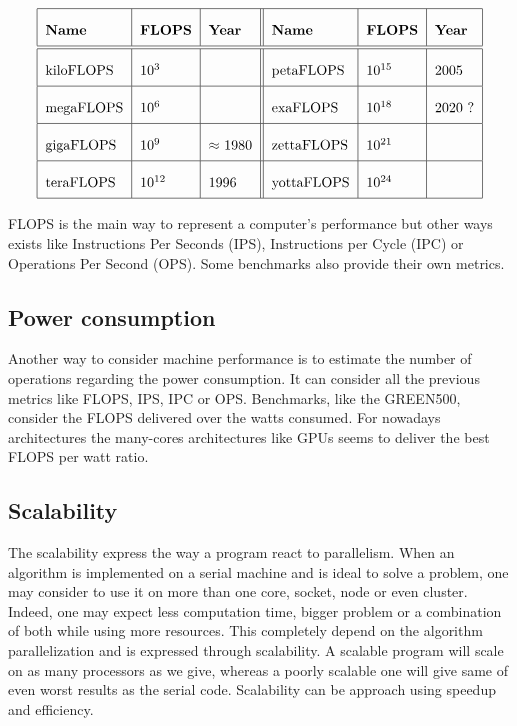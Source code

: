 \begin{table}
\[\arraycolsep=1.4pt\def\arraystretch{2.2}
\begin{tabular}{| l | l | l || l | l | l |}
\hline
	\textbf{Name} & \textbf{FLOPS} & \textbf{Year} & \textbf{Name} & \textbf{FLOPS} & \textbf{Year} \\
	\hline
	\hline
	kiloFLOPS & $10^{3}$ & & petaFLOPS  & $10^{15}$ & 2005 \\ 
	\hline
	megaFLOPS & $10^{6}$ & & exaFLOPS   & $10^{18}$ & 2020 ? \\
	\hline
	gigaFLOPS & $10^{9}$ & $\approx$ 1980  & zettaFLOPS & $10^{21}$ & \\
	\hline
	teraFLOPS & $10^{12}$ & 1996 & yottaFLOPS & $10^{24}$ & \\
	\hline
	\end{tabular}
	\]
	\caption{Floating-point Operation per Second and years of reach in HPC.}
	\label{tab:1_HPC:flops_year}
\end{table}

FLOPS is the main way to represent a computer's performance but other ways exists like Instructions Per Seconds (IPS), Instructions per Cycle (IPC) or Operations Per Second (OPS).
Some benchmarks also provide their own metrics. 

\subsection{Power consumption}
Another way to consider machine performance is to estimate the number of operations regarding the power consumption. 
It can consider all the previous metrics like FLOPS, IPS, IPC or OPS. 
Benchmarks, like the GREEN500, consider the FLOPS delivered over the watts consumed. 
For nowadays architectures the many-cores architectures like GPUs seems to deliver the best FLOPS per watt ratio.

\subsection{Scalability}
The scalability express the way a program react to parallelism. 
When an algorithm is implemented on a serial machine and is ideal to solve a problem, one may consider to use it on more than one core, socket, node or even cluster. 
Indeed, one may expect less computation time, bigger problem or a combination of both while using more resources. 
This completely depend on the algorithm parallelization and is expressed through scalability. 
A scalable program will scale on as many processors as we give, whereas a poorly scalable one will give same of even worst results as the serial code.  
Scalability can be approach using speedup and efficiency.

